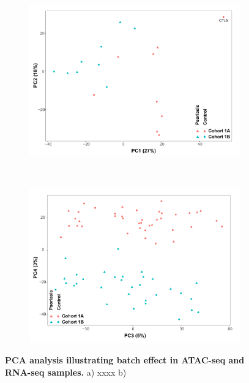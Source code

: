 \bigskip
\begin{figure}[H]
\centering
\begin{subfigure}[b]{0.70\textwidth}
\centering 
\includegraphics[width=\textwidth]{./Appendix/pdfs/Chapter4/ATAC_CD8_PS_CTL_PCA}
\caption{}
\end{subfigure}
~
\begin{subfigure}[b]{0.70\textwidth} 
\centering
\includegraphics[width=\textwidth]{./Appendix/pdfs/Chapter4/PS_CTL_all_samples_varied_PCA3and4_plot}
\caption{}
\end{subfigure}
\caption[PCA analysis illustrating batch effect in ATAC-seq and RNA-seq samples.]{\textbf{PCA analysis illustrating batch effect in ATAC-seq and RNA-seq samples.} a) xxxx  b)}
\label{figure:ATAC_RNAseq_batch_effect}
\end{figure}




